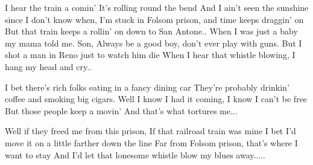 I hear the train a comin'
It's rolling round the bend
And I ain't seen the sunshine since I don't know when,
I'm stuck in Folsom prison, and time keeps draggin' on
But that train keeps a rollin' on down to San Antone..
When I was just a baby my mama told me. Son,
Always be a good boy, don't ever play with guns.
But I shot a man in Reno just to watch him die
When I hear that whistle blowing, I hang my head and cry..

I bet there's rich folks eating in a fancy dining car
They're probably drinkin' coffee and smoking big cigars.
Well I know I had it coming, I know I can't be free
But those people keep a movin'
And that's what tortures me...

Well if they freed me from this prison,
If that railroad train was mine
I bet I'd move it on a little farther down the line
Far from Folsom prison, that's where I want to stay
And I'd let that lonesome whistle blow my blues away..... 